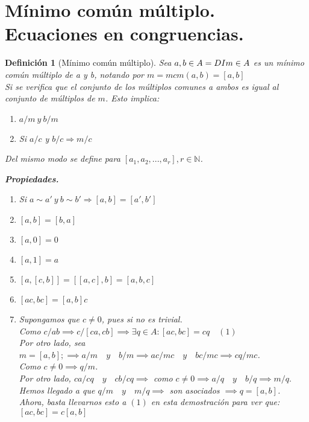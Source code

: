 \documentclass[11pt, a4paper, titlepage]{article}
\makeatletter
\renewenvironment{proof}[1][\proofname] {\vspace{-15pt}\par\pushQED{\qed}\normalfont\topsep6\p@\@plus6\p@\relax\trivlist\item[\hskip\labelsep\it#1\@addpunct{.}]\ignorespaces}{\popQED\endtrivlist\@endpefalse}
\theoremstyle{theorem-style}
\theoremstyle{definition-style}
\newtheorem*{ndef}{Definición}
\theoremstyle{remark-style}
\theoremstyle{example-style}
\newenvironment{nlist}
{\begin{enumerate}
\renewcommand\labelenumi{(\emph{\roman{enumi})}}}
{\end{enumerate}}
\makeatother
\begin{document}
\section{Mínimo común múltiplo. Ecuaciones en congruencias.}
\begin{ndef}[Mínimo común múltiplo]
	Sea $a, b \in A =DI \\ m \in A $ es un mínimo común múltiplo de a y b, notando por $m = mcm(a,b) = [a,b]$  \\
Si se verifica que el conjunto de los múltiplos comunes a ambos es igual al conjunto de múltiplos de $m$. Esto implica: 
\begin{enumerate}
\item $a/m \ y \ b/m$
\item Si $a/c$ y $b/c \Rightarrow m/c$ \\
\end{enumerate}

Del mismo modo se define para $[a_1, a_2, ..., a_r],r \in \mathbb{N}$.

\textbf{Propiedades. }
\begin{nlist}
\item Si $a\sim a' \ y \ b\sim b' \Rightarrow [a,b]=[a',b']$
\item $[a,b] = [b,a]$
\item $[a,0] = 0$
\item $[a,1] = a$
\item $[a,[c,b]]= [[a,c],b] = [a,b,c]$
\item $[ac,bc] =[a,b]c$\\

\begin{proof}[Demostración del último.]
	
	Supongamos que $c\ne 0$, pues si no es trivial.\\
	Como $c/ab\implies c/[ca,cb] \implies \exists q \in A : [ac,bc] = cq\quad (1)$\\
	Por otro lado, sea $m = [a,b]; \implies a/m \quad y \quad b/m \implies ac/mc \quad y \quad bc/mc \implies cq/mc$.\\
	Como $c\ne 0 \implies q/m$.\\
	Por otro lado, $ca/cq \quad y \quad cb/cq \implies$ como $c\ne 0 \implies a/q \quad y \quad b/q \implies m/q.$\\
	Hemos llegado a que $q/m \quad y \quad m/q \implies $ son asociados $\implies q=[a,b]$.\\
	Ahora, basta llevarnos esto a $(1)$ en esta demostración para ver que:\\ $[ac,bc] = c[a,b]$
\end{proof}
\end{nlist}
\end{ndef}
\end{document}
